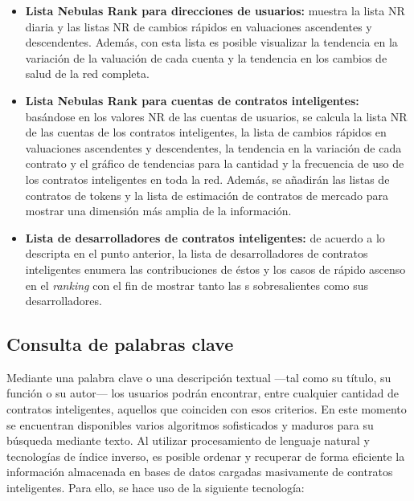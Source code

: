 \begin{itemize}
\item \textbf{Lista Nebulas Rank para direcciones de usuarios:} muestra la lista NR diaria y las listas NR de cambios rápidos en valuaciones ascendentes y descendentes. Además, con esta lista es posible visualizar la tendencia en la variación de la valuación de cada cuenta y la tendencia en los cambios de salud de la red completa.

\item \textbf{Lista Nebulas Rank para cuentas de contratos inteligentes:} basándose en los valores NR de las cuentas de usuarios, se calcula la lista NR de las cuentas de los contratos inteligentes, la lista de cambios rápidos en valuaciones ascendentes y descendentes, la tendencia en la variación de cada contrato y el gráfico de tendencias para la cantidad y la frecuencia de uso de los contratos inteligentes en toda la red. Además, se añadirán las listas de contratos de tokens y la lista de estimación de contratos de mercado para mostrar una dimensión más amplia de la información.

\item \textbf{Lista de desarrolladores de contratos inteligentes:} de acuerdo a lo descripta en el punto anterior, la lista de desarrolladores de contratos inteligentes enumera las contribuciones de éstos y los casos de rápido ascenso en el \textit{ranking} con el fin de mostrar tanto las {\dapp}s sobresalientes como sus desarrolladores.

\end{itemize}

\subsection{Consulta de palabras clave}

Mediante una palabra clave o una descripción textual —tal como su título, su función o su autor— los usuarios podrán encontrar, entre cualquier cantidad de contratos inteligentes, aquellos que coinciden con esos criterios. En este momento se encuentran disponibles varios algoritmos sofisticados y maduros para su búsqueda mediante texto. Al utilizar procesamiento de lenguaje natural y tecnologías de índice inverso, es posible ordenar y recuperar de forma eficiente la información almacenada en bases de datos cargadas masivamente de contratos inteligentes. Para ello, se hace uso de la siguiente tecnología:

